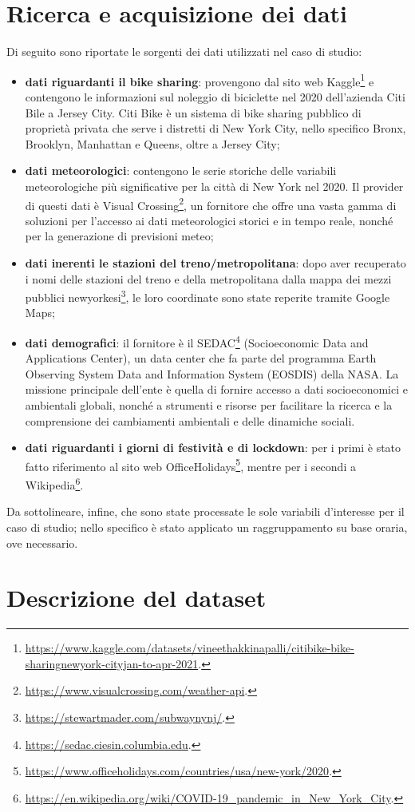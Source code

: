 \section[Ricerca e acquisizione dati]{Ricerca e acquisizione dei dati}
Di seguito sono riportate le sorgenti dei dati utilizzati nel caso di studio:
\begin{itemize}
	\item \textbf{dati riguardanti il bike sharing}: provengono dal sito web Kaggle\footnote{\url{https://www.kaggle.com/datasets/vineethakkinapalli/citibike-bike-sharingnewyork-cityjan-to-apr-2021}.} e contengono le informazioni sul noleggio di biciclette nel \num{2020} dell'azienda Citi Bile a Jersey City. Citi Bike è un sistema di bike sharing pubblico di proprietà privata che serve i distretti di New York City, nello specifico Bronx, Brooklyn, Manhattan e Queens, oltre a Jersey City;
	\item \textbf{dati meteorologici}: contengono le serie storiche delle variabili meteorologiche più significative per la città di New York nel \num{2020}. Il provider di questi dati è Visual Crossing\footnote{\url{https://www.visualcrossing.com/weather-api}.}, un fornitore che offre una vasta gamma di soluzioni per l'accesso ai dati meteorologici storici e in tempo reale, nonché per la generazione di previsioni meteo;
	\item \textbf{dati inerenti le stazioni del treno/metropolitana}: dopo aver recuperato i nomi delle stazioni del treno e della metropolitana dalla mappa dei mezzi pubblici newyorkesi\footnote{\url{https://stewartmader.com/subwaynynj/}.}, le loro coordinate sono state reperite tramite Google Maps;
	\item \textbf{dati demografici}: il fornitore è il SEDAC\footnote{\url{https://sedac.ciesin.columbia.edu}.} (Socioeconomic Data and Applications Center), un data center che fa parte del programma Earth Observing System Data and Information System (EOSDIS) della NASA. La missione principale dell'ente è quella di fornire accesso a dati socioeconomici e ambientali globali, nonché a strumenti e risorse per facilitare la ricerca e la comprensione dei cambiamenti ambientali e delle dinamiche sociali.
	\item \textbf{dati riguardanti i giorni di festività e di lockdown}: per i primi è stato fatto riferimento al sito web OfficeHolidays\footnote{\url{https://www.officeholidays.com/countries/usa/new-york/2020}.}, mentre per i secondi a Wikipedia\footnote{\url{https://en.wikipedia.org/wiki/COVID-19_pandemic_in_New_York_City}.}.
\end{itemize}
Da sottolineare, infine, che sono state processate le sole variabili d'interesse per il caso di studio; nello specifico è stato applicato un raggruppamento su base oraria, ove necessario.

\section[Descrizione del dataset]{Descrizione del dataset}
